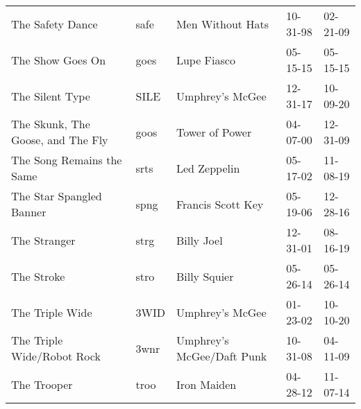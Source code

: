 \begin{longtable}{p{}p{}p{}p{}p{}}
                                                        The Safety Dance &          safe &                                         Men Without Hats &              10-31-98 &             02-21-09 \\
                                                        The Show Goes On &          goes &                                              Lupe Fiasco &              05-15-15 &             05-15-15 \\
                                                         The Silent Type &          SILE &                                          Umphrey's McGee &              12-31-17 &             10-09-20 \\
                                       The Skunk, The Goose, and The Fly &          goos &                                           Tower of Power &              04-07-00 &             12-31-09 \\
                                               The Song Remains the Same &          srts &                                             Led Zeppelin &              05-17-02 &             11-08-19 \\
                                                The Star Spangled Banner &          spng &                                        Francis Scott Key &              05-19-06 &             12-28-16 \\
                                                            The Stranger &          strg &                                               Billy Joel &              12-31-01 &             08-16-19 \\
                                                              The Stroke &          stro &                                             Billy Squier &              05-26-14 &             05-26-14 \\
                                                         The Triple Wide &          3WID &                                          Umphrey's McGee &              01-23-02 &             10-10-20 \\
                                              The Triple Wide/Robot Rock &          3wnr &                                Umphrey's McGee/Daft Punk &              10-31-08 &             04-11-09 \\
                                                             The Trooper &          troo &                                              Iron Maiden &              04-28-12 &             11-07-14 \\

\end{longtable}
